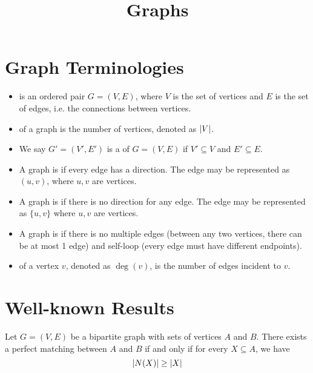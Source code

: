\documentclass[11pt]{scrartcl}
\begin{document}
\title{Graphs}
\maketitle

\section{Graph Terminologies}

\begin{itemize}
    \item {} is an ordered pair $G = (V,E)$, where $V$ is the set of vertices and $E$ is the set of edges, i.e. the connections between vertices.
    \item {} of a graph is the number of vertices, denoted as $\left\lvert V \right\rvert$.
    \item We say $G' = (V',E')$ is a  of $G = (V,E)$ if $V' \subseteq V$ and $E' \subseteq E$.
    \item A graph is  if every edge has a direction. The edge may be represented as $(u,v)$, where $u,v$ are vertices.
    \item A graph is  if there is no direction for any edge. The edge may be represented as $\{u,v\}$ where $u,v$ are vertices.
    \item A graph is  if there is no multiple edges (between any two vertices, there can be at most 1 edge) and self-loop (every edge must have different endpoints).
    \item {} of a vertex $v$, denoted as $\deg(v)$, is the number of edges incident to $v$.
\end{itemize}



\section{Well-known Results}

\begin{theorem}
Let $G = (V,E)$ be a bipartite graph with sets of vertices $A$ and $B$. There exists a perfect matching between $A$ and $B$ if and only if for every $X \subseteq A$, we have
\[\left\lvert N(X) \right\rvert \ge \left\lvert X \right\rvert\]
\end{theorem}
\end{document}
